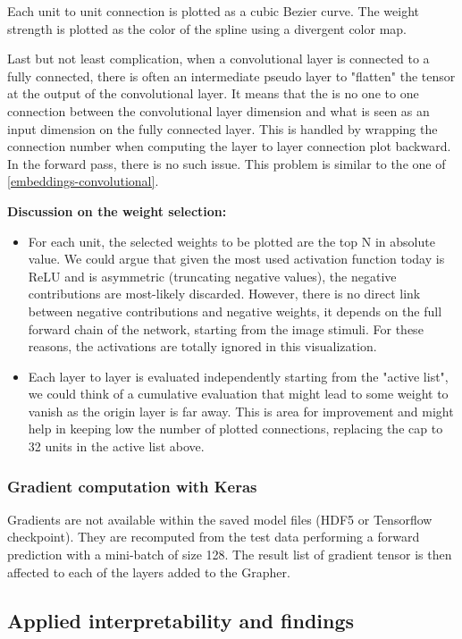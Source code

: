 Each unit to unit connection is plotted as a cubic Bezier curve. The weight strength is plotted as the color of the spline using a divergent color map.

Last but not least complication, when a convolutional layer is connected to a fully connected, there is often an intermediate pseudo layer to "flatten" the tensor at the output of the convolutional layer. It means that the is no one to one connection between the convolutional layer dimension and what is seen as an input dimension on the fully connected layer. This is handled by wrapping the connection number when computing the layer to layer connection plot backward. In the forward pass, there is no such issue. This problem is similar to the one of \ref{embeddings-convolutional}.

\textbf{Discussion on the weight selection:}
\begin{itemize}
    \item For each unit, the selected weights to be plotted are the top N in absolute value. We could argue that given the most used activation function today is ReLU and is asymmetric (truncating negative values), the negative contributions are most-likely discarded. However, there is no direct link between negative contributions and negative weights, it depends on the full forward chain of the network, starting from the image stimuli. For these reasons, the activations are totally ignored in this visualization.
    \item Each layer to layer is evaluated independently starting from the "active list", we could think of a cumulative evaluation that might lead to some weight to vanish as the origin layer is far away. This is area for improvement and might help in keeping low the number of plotted connections, replacing the cap to 32 units in the active list above.
\end{itemize}

\subsubsection{Gradient computation with Keras}

Gradients are not available within the saved model files (HDF5 or Tensorflow checkpoint). They are recomputed from the test data performing a forward prediction with a mini-batch of size 128. The result list of gradient tensor is then affected to each of the layers added to the Grapher.


\subsection{Applied interpretability and findings}

